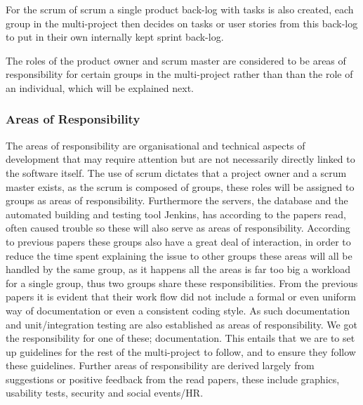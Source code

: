 For the scrum of scrum a single product back-log with tasks is also created, each group in the multi-project then decides on tasks or user stories from this back-log to put in their own internally kept sprint back-log.

The roles of the product owner and scrum master are considered to be areas of responsibility for certain groups in the multi-project rather than than the role of an individual, which will be explained next.

\subsubsection*{Areas of Responsibility}
The areas of responsibility are organisational and technical aspects of development that may require attention but are not necessarily directly linked to the software itself.
The use of scrum dictates that a project owner and a scrum master exists, as the scrum is composed of groups, these roles will be assigned to groups as areas of responsibility.
Furthermore the servers, the database and the automated building and testing tool Jenkins, has according to the papers read, often caused trouble so these will also serve as areas of responsibility. 
According to previous papers these groups also have a great deal of interaction, in order to reduce the time spent explaining the issue to other groups these areas will all be handled by the same group, as it happens all the areas is far too big a workload for a single group, thus two groups share these responsibilities.
From the previous papers it is evident that their work flow did not include a formal or even uniform way of documentation or even a consistent coding style.
As such documentation and unit/integration testing are also established as areas of responsibility.
We got the responsibility for one of these; documentation. 
This entails that we are to set up guidelines for the rest of the multi-project to follow, and to ensure they follow these guidelines.
Further areas of responsibility are derived largely from suggestions or positive feedback from the read papers, these include graphics, usability tests, security and social events/HR.

